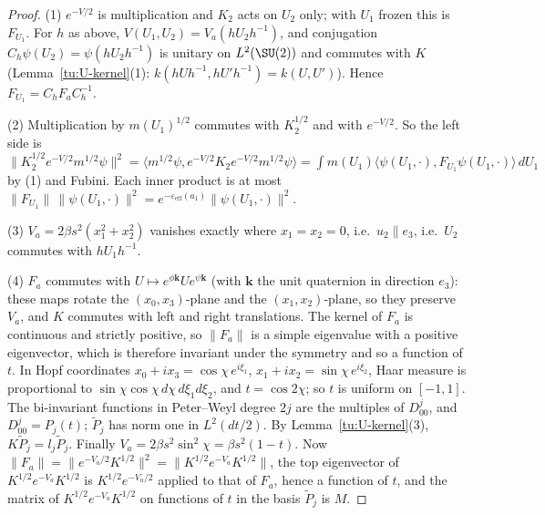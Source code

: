 \begin{proof}
(1) $e^{-V/2}$ is multiplication and $K_2$ acts on $U_2$ only; with $U_1$ frozen this is $F_{U_1}$. For
$h$ as above, $V(U_1,U_2)=V_{a}(hU_2h^{-1})$, and conjugation $C_h\psi(U_2)=\psi(hU_2h^{-1})$ is unitary on
$L^2(\SU(2))$ and commutes with $K$ (Lemma~\ref{tu:U-kernel}(1): $k(hUh^{-1},hU'h^{-1})=k(U,U')$). Hence
$F_{U_1}=C_hF_aC_h^{-1}$.

(2) Multiplication by $m(U_1)^{1/2}$ commutes with $K_2^{1/2}$ and with $e^{-V/2}$. So the left side is
$\|K_2^{1/2}e^{-V/2}m^{1/2}\psi\|^2=\langle m^{1/2}\psi,e^{-V/2}K_2e^{-V/2}m^{1/2}\psi\rangle
=\int m(U_1)\langle\psi(U_1,\cdot),F_{U_1}\psi(U_1,\cdot)\rangle\,dU_1$ by (1) and Fubini. Each inner product is at
most $\|F_{U_1}\|\,\|\psi(U_1,\cdot)\|^2=e^{-\varepsilon_{\mathrm{eff}}(a_1)}\|\psi(U_1,\cdot)\|^2$.

(3) $V_a=2\beta s^2(x_1^2+x_2^2)$ vanishes exactly where $x_1=x_2=0$, i.e.\ $u_2\parallel e_3$, i.e.\ $U_2$
commutes with $hU_1h^{-1}$.

(4) $F_a$ commutes with $U\mapsto e^{\phi\mathbf{k}}Ue^{\psi\mathbf{k}}$ (with $\mathbf{k}$ the unit quaternion
in direction $e_3$): these maps rotate the $(x_0,x_3)$-plane and the $(x_1,x_2)$-plane, so they preserve
$V_a$, and $K$ commutes with left and right translations. The kernel of $F_a$ is continuous and strictly
positive, so $\|F_a\|$ is a simple eigenvalue with a positive eigenvector, which is therefore invariant
under the symmetry and so a function of $t$. In Hopf coordinates $x_0+ix_3=\cos\chi\,e^{i\xi_1}$,
$x_1+ix_2=\sin\chi\,e^{i\xi_2}$, Haar measure is proportional to $\sin\chi\cos\chi\,d\chi\,d\xi_1d\xi_2$, and
$t=\cos2\chi$; so $t$ is uniform on $[-1,1]$. The bi-invariant functions in Peter--Weyl degree $2j$ are the
multiples of $D^j_{00}$, and $D^j_{00}=P_j(t)$; $\tilde P_j$ has norm one in $L^2(dt/2)$. By
Lemma~\ref{tu:U-kernel}(3), $K\tilde P_j=l_j\tilde P_j$. Finally $V_a=2\beta s^2\sin^2\chi=\beta s^2(1-t)$. Now
$\|F_a\|=\|e^{-V_a/2}K^{1/2}\|^2=\|K^{1/2}e^{-V_a}K^{1/2}\|$, the top eigenvector of $K^{1/2}e^{-V_a}K^{1/2}$ is
$K^{1/2}e^{-V_a/2}$ applied to that of $F_a$, hence a function of $t$, and the matrix of
$K^{1/2}e^{-V_a}K^{1/2}$ on functions of $t$ in the basis $\tilde P_j$ is $M$.
\end{proof}

